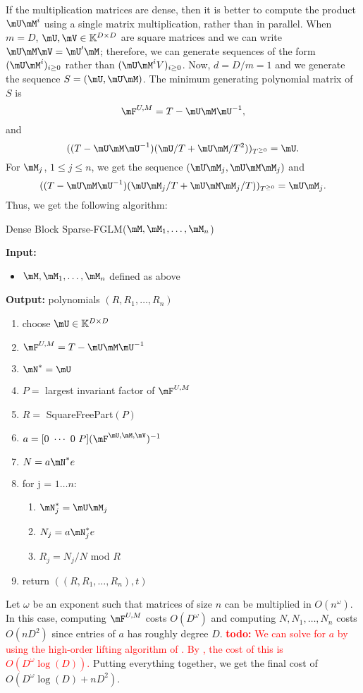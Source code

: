 \documentclass[12pt]{article}
\newcommand{\todo}[1]{\textcolor{red}{{\bf todo:} #1}}
\begin{document}
If the multiplication matrices are dense, then it is
better to compute the product $\mU \mM^i$ using a single matrix multiplication,
rather than in parallel.
When $m = D$, $\mU,\mV \in \mathbb{K}^{D \times D}$ are square matrices
and we can write $\mU\mM\mV = \mU'\mM$; therefore, we can generate sequences of the
form $(\mU\mM^i)_{i\ge0}$ rather than $(\mU\mM^iV)_{i\ge0}$. Now, $d = D/m = 1$
and we generate the sequence $ S = (\mU, \mU\mM)$. The minimum generating polynomial
matrix of $S$ is 
$$\mF^{U,M} = T - \mU\mM\mU^{-1},$$ 
and 
$$((T - \mU\mM\mU^{-1})(\mU/T + \mU\mM/T^2))_{T^{\ge 0}} = \mU. $$
For $\mM_j$, $1 \le j \le n$, we get the sequence $(\mU\mM_j,\mU\mM\mM_j)$ and
$$((T - \mU\mM\mU^{-1})(\mU\mM_j/T + \mU\mM\mM_j/T))_{T^{\ge 0}} = \mU\mM_j.$$
Thus, we get the following algorithm:

\begin{algorithm}[H]
	\caption{Dense Block Sparse-FGLM($\mM,\mM_1,\dots,\mM_n$)}
	{\bf Input:} \vspace{-0.5em}
	\begin{itemize}
		\item $\mM,\mM_1,\dots,\mM_n$ defined as above
	\end{itemize}
	{\bf Output:} polynomials $(R,R_1,\dots,R_n)$
  \begin{enumerate}[{\bf 1.}]
		\item choose $\mU \in \mathbb{K}^{D\times D}$
		\item $\mF^{U,M} = T - \mU\mM\mU^{-1}$
		\item $\mN^{*} = \mU$
		\item $P =$ largest invariant factor of $\mF^{U,M}$
		\item $R =$ SquareFreePart$(P)$
		\item {\sf $a = [0 ~\cdots~ 0~ P] (\mF^{\mU,\mM,\mV})^{-1}$}
		\item {\sf $N=a\mN^*e$}
		\item {for j = $1 \dots n$:}
      \begin{enumerate}[{\bf 8.1.}]
			\item $\mN_j^* = \mU\mM_j$
			\item $N_j = a\mN_j^*e$
			\item $R_j = N_j/N$ mod $R$
		\end{enumerate}
		\item return $((R, R_1,\dots,R_n),t)$
	\end{enumerate}
	\label{algo:dense-block-sparse-fglm}
\end{algorithm}
Let $\omega$ be an exponent such that matrices of size $n$ can be multiplied
in $O(n^{\omega})$. In this case, computing $\mF^{U,M}$ costs $O(D^\omega)$
and computing $N,N_1,\dots,N_n$ costs $O(nD^2)$ since entries of $a$ has roughly degree $D$. \todo{We can solve for $a$ by
using the high-order lifting algorithm of \cite[Algorithm~5]{Stor03}. 
By \cite[Corollary~16]{Stor03}, the cost of this is $O(D^\omega \log(D))$.}
Putting everything together, we get the final cost of $O(D^\omega\log(D) + nD^2)$.
\end{document}
